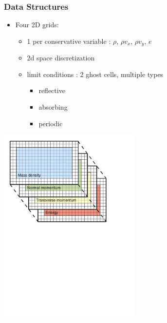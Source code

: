 \begin{frame}
\frametitle{Data Structures}

\begin{itemize}
\item Four 2D grids:
  \begin{itemize}
  \item 1 per conservative variable : $\rho$, $\rho v_x$, $\rho v_y$, $e$
  \item 2d space discretization
  \item limit conditions : 2 ghost cells, multiple types
    \begin{itemize}
    \item reflective
    \item absorbing
    \item periodic
    \end{itemize}
  \end{itemize}
\end{itemize}

\begin{center}
\includegraphics[height=10cm]{./images/Arrays}
\end{center}

\end{frame}

